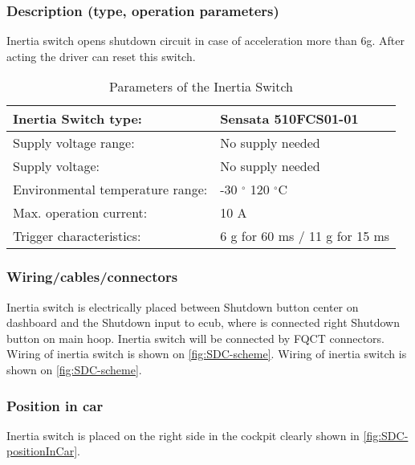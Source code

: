\subsubsection{Description (type, operation parameters)}
\iffalse Describe the Inertia Switch used and use a table for the common operation parameters, like supply voltage, temperature, etc.
Additionally, fill out the following table replacing the values with your specification: \fi

Inertia switch opens shutdown circuit in case of acceleration more than 6g. After acting the driver can reset this switch.
\begin{table}[H]
	\centering
	\caption{Parameters of the Inertia Switch}
	\begin{tabularx}{\textwidth}{|X|l|}
	\hline	Inertia Switch type: & Sensata 510FCS01-01 \\[\TableSize]
	\hline	Supply voltage range: & No supply needed \\[\TableSize]
	\hline	Supply voltage: & No supply needed \\[\TableSize]
	\hline	Environmental temperature range: & -30 $^\circ$ 120 $^\circ$C \\[\TableSize]
	\hline	Max. operation current: & 10 A \\[\TableSize]
	\hline	Trigger characteristics: & 6 g for 60 ms / 11 g for 15 ms \\[\TableSize]
	\hline
	\end{tabularx}%
	\label{tab:inertiaSwitch}%
\end{table}%


\subsubsection{Wiring/cables/connectors}

Inertia switch is electrically placed between Shutdown button center on dashboard and the Shutdown input to \gls{ecub}, where is connected right Shutdown button on main hoop. Inertia switch will be connected by FQCT connectors. Wiring of inertia switch is shown on \ref{fig:SDC-scheme}. Wiring of inertia switch is shown on \ref{fig:SDC-scheme}.
\subsubsection{Position in car}

Inertia switch is placed on the right side in the cockpit clearly shown in \ref{fig:SDC-positionInCar}.